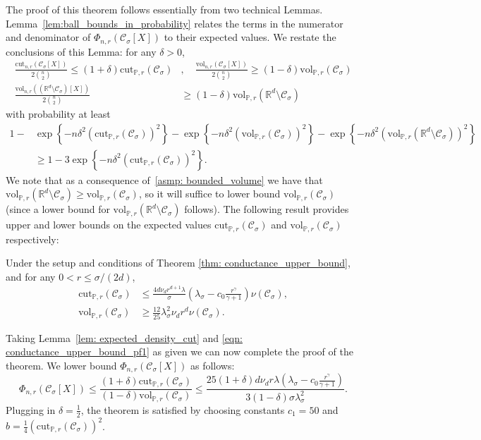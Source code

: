 \documentclass[11pt,twoside]{article}
\newcommand{\set}[1]{\left\{#1\right\}}
\newcommand{\vol}{\mathrm{vol}}
\newcommand{\cut}{\mathrm{cut}}
\newcommand{\Reals}{\mathbb{R}}
\newcommand{\Rd}{\Reals^d}
\newcommand{\1}{\mathbbm{1}}
\newcommand{\Xbf}{X}
\newcommand{\Pbb}{\mathbb{P}}
\newcommand{\Cset}{\mathcal{C}}
\newcommand{\Csig}{\Cset_{\sigma}}
\begin{document}
The proof of this theorem follows essentially from two technical Lemmas. 
Lemma~\ref{lem:ball_bounds_in_probability} relates the terms in the numerator and denominator of $\Phi_{n,r}(\Csig[\Xbf])$ to their expected values. We restate the conclusions of this Lemma: for any $\delta > 0$,
\begin{align}
\frac{\cut_{n,r}(\Csig[\Xbf])}{2{n \choose 2}} \leq (1 + \delta)\cut_{\Pbb,r}(\Csig) &, \quad \frac{\vol_{n,r}(\Csig[\Xbf])}{2{n \choose 2}} \geq (1 - \delta)\vol_{\Pbb,r}(\Csig) \nonumber \\ \frac{\vol_{n,r}((\Rd \setminus \Csig)[\Xbf])}{2{n \choose 2}}& \geq (1 - \delta)\vol_{\Pbb,r}(\Rd \setminus \Csig) \label{eqn: conductance_upper_bound_pf1}
\end{align}
with probability at least 
\begin{align*}
1 - & \exp\set{-n \delta^2 (\cut_{\Pbb,r}(\Csig))^2} - \exp\set{-n \delta^2 (\vol_{\Pbb,r}(\Csig))^2} - \exp\set{-n \delta^2 (\vol_{\Pbb,r}(\Rd\setminus \Csig))^2} \\
& \geq 1 - 3\exp\set{-n \delta^2 (\cut_{\Pbb,r}(\Csig))^2}.
\end{align*} 
We note that as a consequence of~\ref{asmp: bounded_volume} we have that $\vol_{\Pbb,r}(\Rd \setminus \Csig)  \geq \vol_{\Pbb,r}(\Csig)$, so it will suffice to lower bound $\vol_{\Pbb,r}(\Csig)$ (since a lower bound for $\vol_{\Pbb,r}(\Rd \setminus \Csig)$ follows).
The following result provides upper and lower bounds on the expected values $\cut_{\Pbb,r}(\Csig)$ and $\vol_{\Pbb,r}(\Csig)$ respectively:
\begin{lemma}
	\label{lem: expected_density_cut}\label{lem: expected_density_volume}
	Under the setup and conditions of Theorem \ref{thm: conductance_upper_bound}, and for any $0 < r \leq \sigma/(2d)$,
	\begin{align}
	\cut_{\Pbb,r}(\Csig) &\leq \frac{4 d \nu_d r^{d+1} \lambda}{\sigma} \left(\lambda_{\sigma} - c_0\frac{r^{\gamma}}{\gamma + 1}\right) \nu(\Csig), \label{eqn:claim_one} \\
	\vol_{\Pbb,r}(\Csig) &\geq \frac{12}{25} \lambda_{\sigma}^2 \nu_d r^d \nu(\Csig).\label{eqn:claim_two}
	\end{align}
\end{lemma}
Taking Lemma~\ref{lem: expected_density_cut} and \eqref{eqn: conductance_upper_bound_pf1} as given we can now complete the proof of the theorem. We lower bound $\Phi_{n,r}(\Csig[\Xbf])$ as follows:
\begin{equation*}
\Phi_{n,r}(\Csig[\Xbf]) \leq \frac{(1 + \delta)\cut_{\Pbb,r}(\Csig)}{(1 - \delta)\vol_{\Pbb,r}(\Csig)} \leq \frac{25(1 + \delta)d \nu_d r \lambda \left(\lambda_{\sigma} - c_0\frac{r^{\gamma}}{\gamma + 1}\right)}{3(1 - \delta) \sigma \lambda_{\sigma}^2}.
\end{equation*}
Plugging in $\delta = \frac{1}{2}$, the theorem is satisfied by choosing constants $c_1 = 50$ and $b = \frac{1}{4}(\cut_{\Pbb,r}(\Csig))^2$. 
\end{document}
